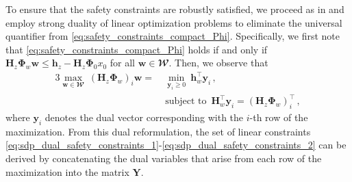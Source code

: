 \documentclass[conference]{IEEEtran}
\DeclareMathOperator*{\st}{subject~to}
\begin{document}
    To ensure that the safety constraints are robustly satisfied, we proceed as in \cite{martin2022safe} and employ strong duality of linear optimization problems to eliminate the universal quantifier from \eqref{eq:safety_constraints_compact_Phi}. Specifically, we first note that \eqref{eq:safety_constraints_compact_Phi} holds if and only if $\mathbf{H}_z \bm{\Phi}_w \mathbf{w} \leq \mathbf{h}_z - \mathbf{H}_z \bm{\Phi}_0 x_0$ for all $\mathbf{w} \in \mathbfcal{W}$. Then, we observe that
    \begin{alignat*}{3}
        \max_{\mathbf{w} \in \mathbfcal{W}} ~ \left(
        \mathbf{H}_z
        \bm{\Phi}_w
        \right)_i \mathbf{w} = & ~ \min_{\mathbf{y}_i \geq 0} ~ \mathbf{h}_w^\top \mathbf{y}_i\,,\\
        & \st ~ \mathbf{H}_w^\top \mathbf{y}_i = \left(
        \mathbf{H}_z
        \bm{\Phi}_w
        \right)_i^\top\,,
    \end{alignat*}
    where $\mathbf{y}_i$ denotes the dual vector corresponding with the $i$-th row of the maximization. From this dual reformulation, the set of linear constraints \eqref{eq:sdp_dual_safety_constraints_1}-\eqref{eq:sdp_dual_safety_constraints_2} can be derived by concatenating the dual variables that arise from each row of the maximization into the matrix $\mathbf{Y}$.
\end{document}
